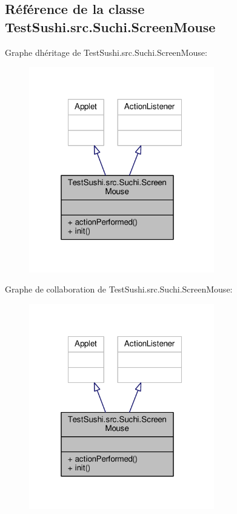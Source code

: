 \hypertarget{classTestSushi_1_1src_1_1Suchi_1_1ScreenMouse}{}\subsection{Référence de la classe Test\+Sushi.\+src.\+Suchi.\+Screen\+Mouse}
\label{classTestSushi_1_1src_1_1Suchi_1_1ScreenMouse}


Graphe d\textquotesingle{}héritage de Test\+Sushi.\+src.\+Suchi.\+Screen\+Mouse\+:\nopagebreak
\begin{figure}[H]
\begin{center}
\leavevmode
\includegraphics[width=229pt]{classTestSushi_1_1src_1_1Suchi_1_1ScreenMouse__inherit__graph}
\end{center}
\end{figure}


Graphe de collaboration de Test\+Sushi.\+src.\+Suchi.\+Screen\+Mouse\+:\nopagebreak
\begin{figure}[H]
\begin{center}
\leavevmode
\includegraphics[width=229pt]{classTestSushi_1_1src_1_1Suchi_1_1ScreenMouse__coll__graph}
\end{center}
\end{figure}
